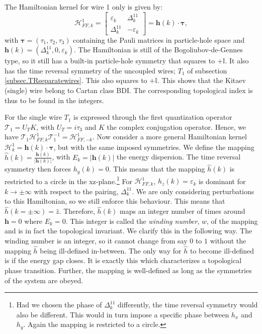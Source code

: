 The Hamiltonian kernel for wire 1 only is given by: 
\begin{equation}
\mathcal{H}^{1}_{FF,k} = \begin{bmatrix} \varepsilon_k & \Delta^{11}_k \\ \Delta^{11}_k & -\varepsilon_k \end{bmatrix} = \mathbf{h}(k)\cdot\boldsymbol\tau,
\label{eq.singlewire.Hamiltoniankernel}
\end{equation}
with $\boldsymbol\tau = (\tau_1, \tau_2, \tau_3)$ containing the Pauli matrices in particle-hole space and $\mathbf{h}(k) = (\Delta^{11}_k, 0, \varepsilon_k)$. The Hamiltonian is still of the Bogoliubov-de-Gennes type, so it still has a built-in particle-hole symmetry that squares to $+\mathbb{I}$. It also has the time reversal symmetry of the uncoupled wires; $T_1$ of subsection \ref{subsec.TRseparatewires}. This also squares to $+\mathbb{I}$. This shows that the Kitaev (single) wire belong to Cartan class BDI. The corresponding topological index is thus to be found in the integers. 

For the single wire $T_1$ is expressed through the first quantization operator $\mathcal{T}_1 = U_TK$, with $U_T = i\tau_3$ and $K$ the complex conjugation operator. Hence, we have $\mathcal{T}_1\mathcal{H}^{1}_{FF,k}\mathcal{T}^{-1}_1 = \mathcal{H}^{1}_{FF,-k}$. Now consider a more general Hamiltonian kernel $\mathcal{H}^{1}_k = \mathbf{h}(k)\cdot\boldsymbol\tau$, but with the same imposed symmetries. We define the mapping $\hat{h}(k) = \frac{\mathbf{h}(k)}{|\mathbf{h}(k)|}$, with $E_k = |\mathbf{h}(k)|$ the energy dispersion. The time reversal symmetry then forces $h_y(k) = 0$. This means that the mapping $\hat{h}(k)$ is restricted to a circle in the xz-plane.\footnote{Had we chosen the phase of $\Delta^{11}_k$ differently, the time reversal symmetry would also be different. This would in turn impose a specific phase between $h_x$ and $h_y$. Again the mapping is restricted to a circle.} For $\mathcal{H}^{1}_{FF,k}$, $h_z(k) = \varepsilon_k$ is dominant for $k\to \pm \infty$ with respect to the pairing, $\Delta^{11}_k$. We are only considering perturbations to this Hamiltonian, so we still enforce this behaviour. This means that $\hat{h}(k = \pm \infty) = \hat{z}$. Therefore, $\hat{h}(k)$ maps an integer number of times around $\mathbf{h} = 0$ where $E_k = 0$. This integer is called the \textit{winding number}, $w$, of the mapping and is in fact the topological invariant. We clarify this in the following way. The winding number is an integer, so it cannot change from say $0$ to $1$ without the mapping $\hat{h}$ being ill-defined in-between. The only way for $\hat{h}$ to become ill-defined is if the energy gap closes. It is exactly this which characterizes a topological phase transition. Further, the mapping is well-defined as long as the symmetries of the system are obeyed. 

